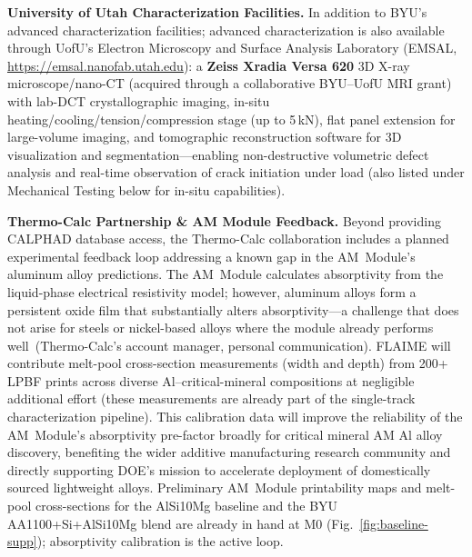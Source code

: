 \documentclass[11pt,letterpaper]{article}
\begin{document}
\textbf{University of Utah Characterization Facilities.}
In addition to BYU's advanced characterization facilities; advanced characterization is also available through UofU's Electron Microscopy and
Surface Analysis Laboratory (EMSAL, \url{https://emsal.nanofab.utah.edu}):
a \textbf{Zeiss Xradia Versa 620} 3D X-ray microscope/nano-CT (acquired
through a collaborative BYU--UofU MRI grant) with lab-DCT
crystallographic imaging, in-situ heating/cooling/tension/compression
stage (up to 5\,kN), flat panel extension for large-volume imaging,
and tomographic reconstruction software for 3D visualization and
segmentation---enabling non-destructive volumetric defect analysis and
real-time observation of crack initiation under load
(also listed under Mechanical Testing below for in-situ capabilities).

\textbf{Thermo-Calc Partnership \& AM Module Feedback.}
Beyond providing CALPHAD database access, the Thermo-Calc collaboration
includes a planned experimental feedback loop addressing a known gap in the
AM~Module's aluminum alloy predictions.  The AM~Module calculates
absorptivity from the liquid-phase electrical resistivity model; however,
aluminum alloys form a persistent oxide film that substantially alters
absorptivity---a challenge that does not arise for steels or nickel-based
alloys where the module already performs well~(Thermo-Calc's account manager,
personal communication).  FLAIME will contribute melt-pool cross-section
measurements (width and depth) from 200+ LPBF prints across diverse
Al--critical-mineral compositions at negligible additional effort (these
measurements are already part of the single-track characterization
pipeline).  This calibration data will improve the reliability of the
AM~Module's absorptivity pre-factor broadly for critical mineral AM Al
alloy discovery, benefiting the wider additive manufacturing research
community and directly supporting DOE's mission to accelerate
deployment of domestically sourced lightweight alloys. Preliminary
AM~Module printability maps and melt-pool cross-sections for the
AlSi10Mg baseline and the BYU AA1100+Si+AlSi10Mg blend are already in
hand at M0 (Fig.~\ref{fig:baseline-supp}); absorptivity calibration is
the active loop.
\end{document}
